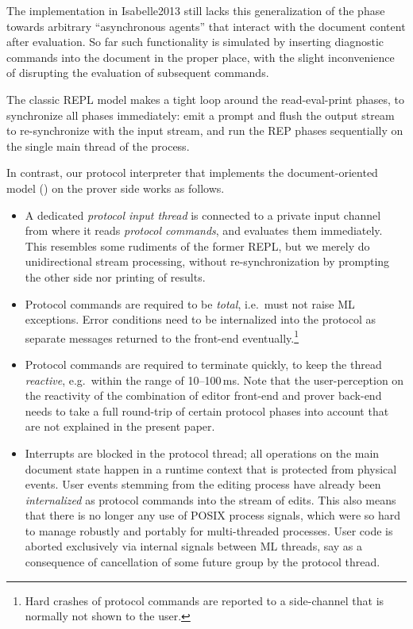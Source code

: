 \begin{isabellebody}
\begin{isamarkuptext}
  The implementation in Isabelle2013 still lacks this generalization
  of the  phase towards arbitrary ``asynchronous agents''
  that interact with the document content after evaluation.  So far
  such functionality is simulated by inserting diagnostic commands
  into the document in the proper place, with the slight inconvenience
  of disrupting the evaluation of subsequent commands.%
\end{isamarkuptext}%
\isamarkuptrue%
%
\isamarkuptrue%
%
\begin{isamarkuptext}%
The classic REPL model makes a tight loop around the
  read-eval-print phases, to synchronize all phases immediately: emit
  a prompt and flush the output stream to re-synchronize with the
  input stream, and run the REP phases sequentially on the single
  main thread of the process.

  In contrast, our protocol interpreter that implements the
  document-oriented model () on the prover side
  works as follows.

  \begin{itemize}

  \item A dedicated \emph{protocol input thread} is connected to a
  private input channel from where it reads \emph{protocol commands},
  and evaluates them immediately.  This resembles some rudiments of
  the former REPL, but we merely do unidirectional stream processing,
  without re-synchronization by prompting the other side nor printing
  of results.

  \item Protocol commands are required to be \emph{total}, i.e.\ must
  not raise ML exceptions.  Error conditions need to be internalized
  into the protocol as separate messages returned to the front-end
  eventually.\footnote{Hard crashes of protocol commands are reported
  to a side-channel that is normally not shown to the user.}

  \item Protocol commands are required to terminate quickly, to keep
  the thread \emph{reactive}, e.g.\ within the range of 10--100\,ms.
  Note that the user-perception on the reactivity of the combination
  of editor front-end and prover back-end needs to take a full
  round-trip of certain protocol phases into account that are not
  explained in the present paper.

  \item Interrupts are blocked in the protocol thread; all operations
  on the main document state happen in a runtime context that is
  protected from physical events.  User events stemming from the
  editing process have already been \emph{internalized} as protocol
  commands into the stream of edits.  This also means that there is no
  longer any use of POSIX process signals, which were so hard to
  manage robustly and portably for multi-threaded processes.  User
  code is aborted exclusively via internal signals between ML threads,
  say as a consequence of cancellation of some future group by the
  protocol thread.


\end{itemize}
\end{isamarkuptext}
\end{isabellebody}
